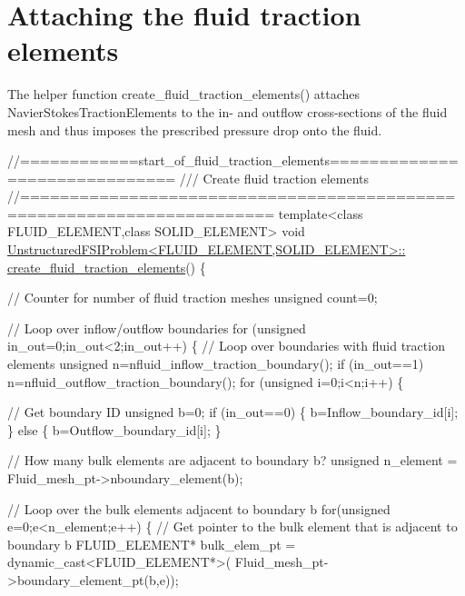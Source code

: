  

\hypertarget{index_fluid_traction}{}\section{Attaching the fluid traction elements}\label{index_fluid_traction}
The helper function {\ttfamily create\+\_\+fluid\+\_\+traction\+\_\+elements()} attaches {\ttfamily Navier\+Stokes\+Traction\+Elements} to the in-\/ and outflow cross-\/sections of the fluid mesh and thus imposes the prescribed pressure drop onto the fluid.


\begin{DoxyCodeInclude}
\textcolor{comment}{//============start\_of\_fluid\_traction\_elements==============================}
\textcolor{comment}{/// Create fluid traction elements }
\textcolor{comment}{}\textcolor{comment}{//=======================================================================}
\textcolor{keyword}{template}<\textcolor{keyword}{class} FLUID\_ELEMENT,\textcolor{keyword}{class} SOLID\_ELEMENT>
\textcolor{keywordtype}{void} \hyperlink{classUnstructuredFSIProblem_af766e3bbc8963a286678cb1d277909f5}{UnstructuredFSIProblem<FLUID\_ELEMENT,SOLID\_ELEMENT>::}
\hyperlink{classUnstructuredFSIProblem_af766e3bbc8963a286678cb1d277909f5}{create\_fluid\_traction\_elements}()
\{

 \textcolor{comment}{// Counter for number of fluid traction meshes}
 \textcolor{keywordtype}{unsigned} count=0;

 \textcolor{comment}{// Loop over inflow/outflow boundaries}
 \textcolor{keywordflow}{for} (\textcolor{keywordtype}{unsigned} in\_out=0;in\_out<2;in\_out++)
  \{
   \textcolor{comment}{// Loop over boundaries with fluid traction elements}
   \textcolor{keywordtype}{unsigned} n=nfluid\_inflow\_traction\_boundary();
   \textcolor{keywordflow}{if} (in\_out==1) n=nfluid\_outflow\_traction\_boundary();
   \textcolor{keywordflow}{for} (\textcolor{keywordtype}{unsigned} i=0;i<n;i++)
    \{
     
     \textcolor{comment}{// Get boundary ID}
     \textcolor{keywordtype}{unsigned} b=0;
     \textcolor{keywordflow}{if} (in\_out==0)
      \{
       b=Inflow\_boundary\_id[i];
      \}
     \textcolor{keywordflow}{else}
      \{
       b=Outflow\_boundary\_id[i];
      \}

     \textcolor{comment}{// How many bulk elements are adjacent to boundary b?}
     \textcolor{keywordtype}{unsigned} n\_element = Fluid\_mesh\_pt->nboundary\_element(b);
     
     \textcolor{comment}{// Loop over the bulk elements adjacent to boundary b}
     \textcolor{keywordflow}{for}(\textcolor{keywordtype}{unsigned} e=0;e<n\_element;e++)
      \{
       \textcolor{comment}{// Get pointer to the bulk element that is adjacent to boundary b}
       FLUID\_ELEMENT* bulk\_elem\_pt = \textcolor{keyword}{dynamic\_cast<}FLUID\_ELEMENT*\textcolor{keyword}{>}(
        Fluid\_mesh\_pt->boundary\_element\_pt(b,e));
       

\end{DoxyCodeInclude}

